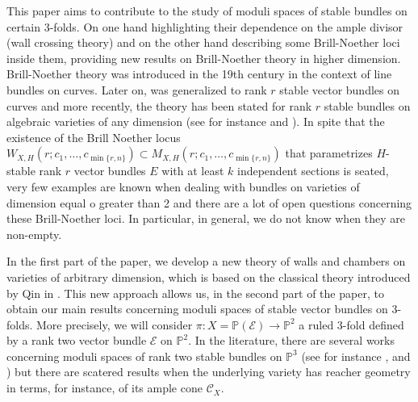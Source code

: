 \documentclass[11pt,twoside]{amsart}
\theoremstyle{definition}
\begin{document}
This paper aims to contribute to the study of moduli spaces of stable bundles on certain 3-folds. On one hand highlighting their dependence on the ample divisor (wall crossing theory) and on the other hand describing some Brill-Noether loci inside them, providing new results on Brill-Noether theory in higher dimension. Brill-Noether theory was introduced in the 19th century in the context of line bundles on curves. Later on, was generalized to rank $r$ stable vector bundles on curves and more recently, the theory has been stated for rank $r$ stable bundles on algebraic varieties of any dimension (see for instance \cite{Brill-Noether} and \cite{higherBN}). In spite that the existence of the Brill Noether locus $W_{X,H}(r;c_1, \dots, c_{\min \{r,n \}}) \subset M_{X,H}(r;c_1, \dots, c_{\min \{r,n \}}) $ that parametrizes $H$-stable rank $r$ vector bundles $E$ with at least $k$ independent sections is seated, very few examples are known when dealing with bundles on varieties of dimension equal o greater than 2 and there are a lot of open questions concerning these Brill-Noether loci. In particular, in general, we do not know when they are non-empty. 

In the first part of the paper, we develop a new theory of walls and chambers on varieties of arbitrary dimension, which is based on the classical theory introduced by Qin in \cite{Qin1}. This new approach allows us, in the second part of the paper, to obtain our main results concerning moduli spaces of stable vector bundles on 3-folds. More precisely, we will consider $\pi:X=\mathbb{P}(\mathcal{E})\rightarrow \mathbb{P}^2$ a ruled 3-fold defined by a rank two vector bundle $\mathcal{E}$ on $ \mathbb{P}^2$. In the literature, there are several works concerning moduli spaces of rank two stable bundles on $ \mathbb{P}^3$ (see for instance \cite{Hartshorne1978}, \cite{Vitter2003} and \cite{Coanda}) but there are scatered results when the underlying variety has reacher geometry in terms, for instance, of its ample cone $\mathcal{C}_X$. 
\end{document}
